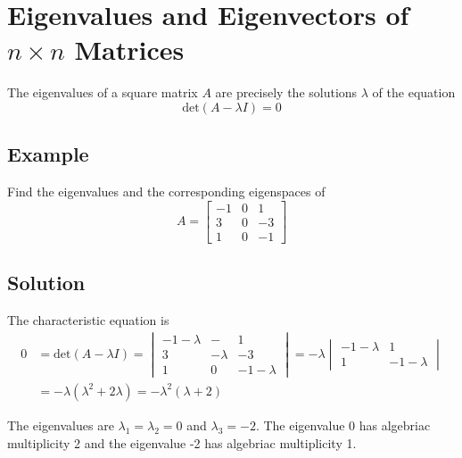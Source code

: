 \section{Eigenvalues and Eigenvectors of $n\times n$ Matrices}

The eigenvalues of a square matrix $A$ are precisely the solutions $\lambda$ of the equation
\[\text{det}(A-\lambda I)=0\]

\subsection*{Example}
Find the eigenvalues and the corresponding eigenspaces of
\[A=\begin{bmatrix}
        -1 & 0 & 1  \\
        3  & 0 & -3 \\
        1  & 0 & -1
    \end{bmatrix}\]

\subsection*{Solution}
The characteristic equation is
\begin{align*}
    0 & =\text{det}(A-\lambda I)=\begin{vmatrix}
        -1-\lambda & -        & 1          \\
        3          & -\lambda & -3         \\
        1          & 0        & -1-\lambda
    \end{vmatrix}=-\lambda\begin{vmatrix}
        -1-\lambda & 1          \\
        1          & -1-\lambda
    \end{vmatrix} \\
      & =-\lambda(\lambda^2+2\lambda)=-\lambda^2(\lambda+2)
\end{align*}

The eigenvalues are $\lambda_1=\lambda_2=0$ and $\lambda_3=-2$. The eigenvalue 0 has
algebriac multiplicity 2 and the eigenvalue -2 has algebriac multiplicity 1.

